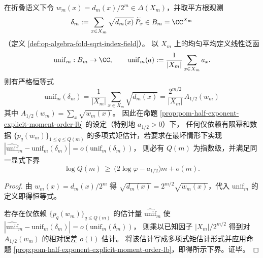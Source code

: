 \begin{corollary}\label{cor:pom-unknot-average-moment-inaccessibility}
在折叠语义下令 \(w_m(x)=d_m(x)/2^m\in\Delta(X_m)\)，并取平方根观测
\[
\delta_m:=\sum_{x\in X_m}\sqrt{d_m(x)}\,\widetilde P_x\in B_m=\CC^{X_m}
\]
（定义 \ref{def:op-algebra-fold-sqrt-index-field}）。
以 \(X_m\) 上的均匀平均定义线性泛函
\[
\mathrm{unif}_m:B_m\to\CC,\qquad
\mathrm{unif}_m(a):=\frac{1}{|X_m|}\sum_{x\in X_m}a_x.
\]
则有严格恒等式
\[
\boxed{\;
\mathrm{unif}_m(\delta_m)
=\frac{1}{|X_m|}\sum_{x\in X_m}\sqrt{d_m(x)}
=\frac{2^{m/2}}{|X_m|}\,A_{1/2}(w_m)\;}
\]
其中 \(A_{1/2}(w_m)=\sum_x\sqrt{w_m(x)}\)。
因此在命题 \ref{prop:pom-half-exponent-explicit-moment-order-lb} 的设定（特别地 \(a_{1/2}>0\)）下，
任何仅依赖有限幂和数据 \(\{p_q(w_m)\}_{1\le q\le Q(m)}\) 的多项式矩估计，若要求在最坏情形下实现
\(|\widehat{\mathrm{unif}}_m-\mathrm{unif}_m(\delta_m)|=o(\mathrm{unif}_m(\delta_m))\)，
则必有 \(Q(m)\) 为指数级，并满足同一显式下界
\[
\log Q(m)\ \ge\ \bigl(2\log\varphi-a_{1/2}\bigr)m+o(m).
\]
\end{corollary}
\begin{proof}
由 \(w_m(x)=d_m(x)/2^m\) 得 \(\sqrt{d_m(x)}=2^{m/2}\sqrt{w_m(x)}\)，代入 \(\mathrm{unif}_m\) 的定义即得恒等式。
\par
若存在仅依赖 \(\{p_q(w_m)\}_{q\le Q(m)}\) 的估计量 \(\widehat{\mathrm{unif}}_m\) 使
\(|\widehat{\mathrm{unif}}_m-\mathrm{unif}_m(\delta_m)|=o(\mathrm{unif}_m(\delta_m))\)，
则乘以已知因子 \(|X_m|/2^{m/2}\) 得到对 \(A_{1/2}(w_m)\) 的相对误差 \(o(1)\) 估计。
将该估计写成多项式矩估计形式并应用命题 \ref{prop:pom-half-exponent-explicit-moment-order-lb}，即得所示下界。证毕。
\end{proof}
